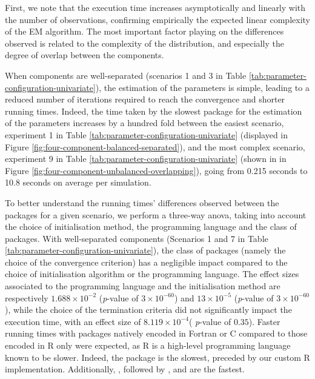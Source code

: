 First, we note that the execution time increases asymptotically and
linearly with the number of observations, confirming empirically the
expected linear complexity of the EM algorithm. The most important
factor playing on the differences observed is related to the complexity
of the distribution, and especially the degree of overlap between the
components.

When components are well-separated (scenarios 1 and 3 in Table \ref{tab:parameter-configuration-univariate}), the estimation of
the parameters is simple, leading to a reduced number of iterations
required to reach the convergence and shorter running times. Indeed, the
time taken by the slowest package for the estimation of the parameters
increases by a hundred fold between the easiest scenario, experiment 1
in Table \ref{tab:parameter-configuration-univariate} (displayed in
Figure \ref{fig:four-component-balanced-separated}), and the most
complex scenario, experiment 9 in Table
\ref{tab:parameter-configuration-univariate} (shown in in Figure
\ref{fig:four-component-unbalanced-overlapping}), going from 0.215
seconds to 10.8 seconds on average per simulation.

To better understand the running times' differences observed between the
packages for a given scenario, we perform a three-way anova, taking into
account the choice of initialisation method, the programming language
and the class of packages. With well-separated components (Scenarios 1
and 7 in Table \ref{tab:parameter-configuration-univariate}), the class
of packages (namely the choice of the convergence criterion) has a negligible
impact compared to the choice of initialisation algorithm or the programming
language. The effect sizes associated to the programming language and
the initialisation method are respectively \(1.688 \times 10^{-2}\)
(\emph{p}-value of \(3 \times 10^{-60}\)) and \(13 \times 10^{-5}\) (\emph{p}-value of
\(3 \times 10^{-60}\)), while the choice of the termination criteria did
not significantly impact the execution time, with an effect size of
\(8.119 \times 10^{-4}\)( \emph{p}-value of \(0.35\)). Faster running times with
packages natively encoded in Fortran or C compared to those encoded in R
only were expected, as R is a high-level programming language known to
be slower. Indeed, the  package is the slowest, preceded by
our custom R implementation. Additionally,
, followed by ,  and 
are the fastest.

